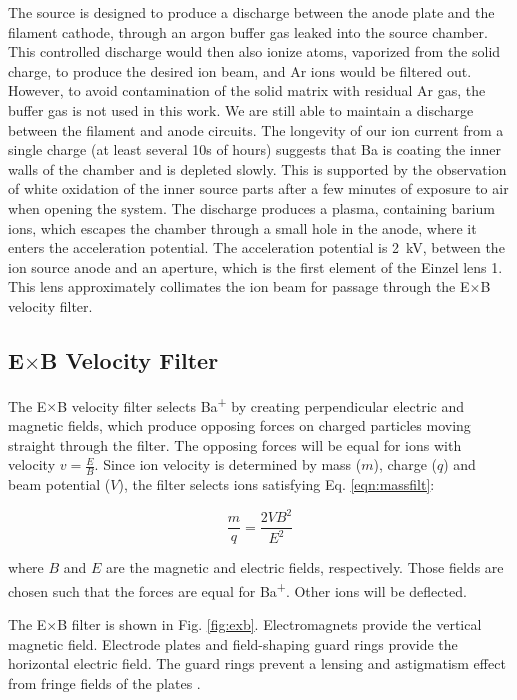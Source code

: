 The source is designed to produce a discharge between the anode plate and the filament cathode, through an argon buffer gas leaked into the source chamber.  This controlled discharge would then also ionize atoms, vaporized  from the solid charge, to produce the desired ion beam, and Ar ions would be filtered out.  However, to avoid contamination of the solid matrix with residual Ar gas, the buffer gas is not used in this work.  We are still able to maintain a discharge between the filament and anode circuits.  The longevity of our ion current from a single charge (at least several 10s of hours) suggests that Ba is coating the inner walls of the chamber and is depleted slowly.  This is supported by the observation of white oxidation of the inner source parts after a few minutes of exposure to air when opening the system.  The discharge produces a plasma, containing barium ions, which escapes the chamber through a small hole in the anode, where it enters the acceleration potential.  The acceleration potential is 2~kV, between the ion source anode and an aperture, which is the first element of the Einzel lens 1.  This lens approximately collimates the ion beam for passage through the E$\times$B velocity filter.

\subsection{E$\times$B Velocity Filter}

The E$\times$B velocity filter selects Ba\textsuperscript{+} by creating perpendicular electric and magnetic fields, which produce opposing forces on charged particles moving straight through the filter.  The opposing forces will be equal for ions with velocity $v = \frac{E}{B}$.  Since ion velocity is determined by mass ($m$), charge ($q$) and beam potential ($V$), the filter selects ions satisfying Eq. \ref{eqn:massfilt}:

\begin{equation}
\frac{m}{q} = \frac{2 V B^{2}}{E^{2}}
\label{eqn:massfilt}
\end{equation}

\noindent
where $B$ and $E$ are the magnetic and electric fields, respectively.  Those fields are chosen such that the forces are equal for Ba\textsuperscript{+}.  Other ions will be deflected.  

The E$\times$B filter is shown in Fig. \ref{fig:exb}.  Electromagnets provide the vertical magnetic field.  Electrode plates and field-shaping guard rings provide the horizontal electric field.  The guard rings prevent a lensing and astigmatism effect from fringe fields of the plates \cite{Colutron}.


